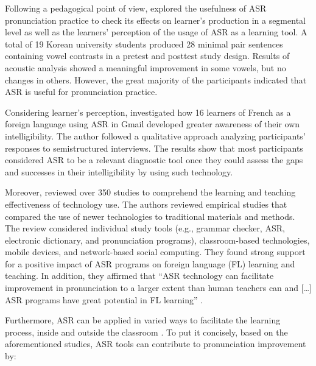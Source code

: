 \documentclass[english]{textolivre}
\begin{document}
Following a pedagogical point of view, \textcite{inceoglu_asr_2020} explored the usefulness of ASR pronunciation practice to check its effects on learner’s production in a segmental level as well as the learners’ perception of the usage of ASR as a learning tool. A total of 19 Korean university students produced 28 minimal pair sentences containing vowel contrasts in a pretest and posttest study design. Results of acoustic analysis showed a meaningful improvement in some vowels, but no changes in others. However, the great majority of the participants indicated that ASR is useful for pronunciation practice.

Considering learner’s perception, \textcite{mroz_seeing_2018} investigated how 16 learners of French as a foreign language using ASR in Gmail developed greater awareness of their own intelligibility. The author followed a qualitative approach analyzing participants’ responses to semistructured interviews. The results show that most participants considered ASR to be a relevant diagnostic tool once they could assess the gaps and successes in their intelligibility by using such technology.

Moreover, \textcite{golonka_technologies_2014} reviewed over 350 studies to comprehend the learning and teaching effectiveness of technology use. The authors reviewed empirical studies that compared the use of newer technologies to traditional materials and methods. The review considered individual study tools (e.g., grammar checker, ASR, electronic dictionary, and pronunciation programs), classroom-based technologies, mobile devices, and network-based social computing. They found strong support for a positive impact of ASR programs on foreign language (FL) learning and teaching. In addition, they affirmed that “ASR technology can facilitate improvement in pronunciation to a larger extent than human teachers can and […] ASR programs have great potential in FL learning” \textcite[p. 88]{golonka_technologies_2014}.

Furthermore, ASR can be applied in varied ways to facilitate the learning process, inside and outside the classroom \cite{kim_automatic_2006, chen_developing_2011, levis_2013, golonka_technologies_2014, ashwell_how_2017, liakin_mobilizing_2017, mroz_seeing_2018, dizon_intelligent_2020, Dizon2020EvaluatingIP, inceoglu_asr_2020, mccrocklin_revisiting_2020, rogerson-revell_computer-assisted_2021}. To put it concisely, based on the aforementioned studies, ASR tools can contribute to pronunciation improvement by:
\end{document}
